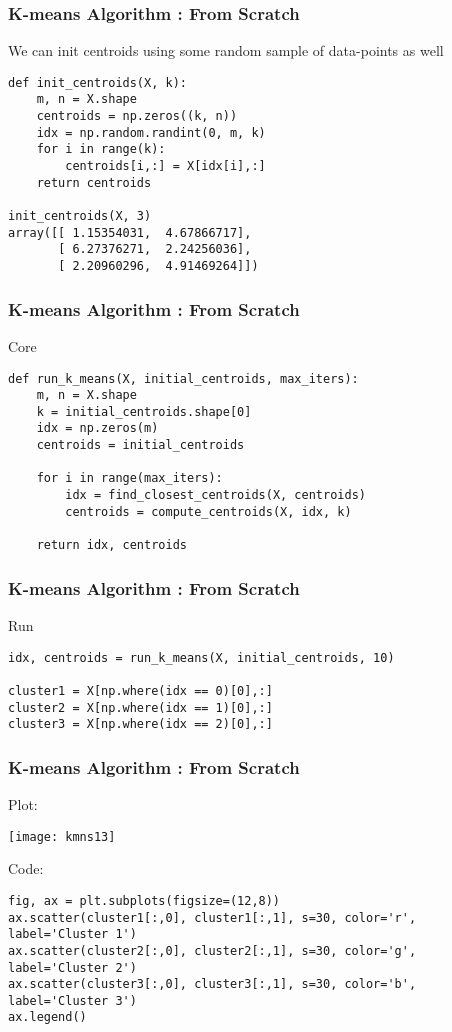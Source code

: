\begin{frame}[fragile]\frametitle{K-means Algorithm : From Scratch}
We can init centroids using some random sample of data-points as well
\begin{lstlisting}
def init_centroids(X, k):
    m, n = X.shape
    centroids = np.zeros((k, n))
    idx = np.random.randint(0, m, k)
    for i in range(k):
        centroids[i,:] = X[idx[i],:]
    return centroids
    
init_centroids(X, 3)
array([[ 1.15354031,  4.67866717],
       [ 6.27376271,  2.24256036],
       [ 2.20960296,  4.91469264]])
\end{lstlisting}
\end{frame}



\begin{frame}[fragile]\frametitle{K-means Algorithm : From Scratch}
Core
\begin{lstlisting}
def run_k_means(X, initial_centroids, max_iters):
    m, n = X.shape
    k = initial_centroids.shape[0]
    idx = np.zeros(m)
    centroids = initial_centroids
    
    for i in range(max_iters):
        idx = find_closest_centroids(X, centroids)
        centroids = compute_centroids(X, idx, k)
    
    return idx, centroids
\end{lstlisting}
\end{frame}

\begin{frame}[fragile]\frametitle{K-means Algorithm : From Scratch}
Run
\begin{lstlisting}
idx, centroids = run_k_means(X, initial_centroids, 10)

cluster1 = X[np.where(idx == 0)[0],:]
cluster2 = X[np.where(idx == 1)[0],:]
cluster3 = X[np.where(idx == 2)[0],:]
\end{lstlisting}
\end{frame}

\begin{frame}[fragile]\frametitle{K-means Algorithm : From Scratch}
Plot:

\begin{center}
\texttt{[image: kmns13]}
\end{center}

Code:
\begin{lstlisting}
fig, ax = plt.subplots(figsize=(12,8))
ax.scatter(cluster1[:,0], cluster1[:,1], s=30, color='r', label='Cluster 1')
ax.scatter(cluster2[:,0], cluster2[:,1], s=30, color='g', label='Cluster 2')
ax.scatter(cluster3[:,0], cluster3[:,1], s=30, color='b', label='Cluster 3')
ax.legend()
\end{lstlisting}

\end{frame}



